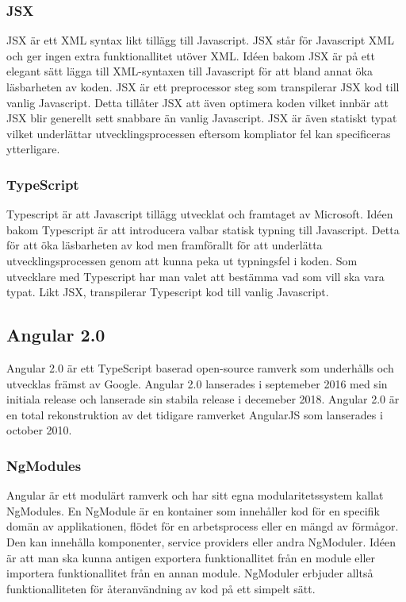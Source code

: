 \subsubsection{JSX}
JSX är ett XML syntax likt tillägg till Javascript. JSX står för Javascript XML och ger ingen extra funktionallitet utöver XML. Idéen bakom JSX är på ett elegant sätt lägga till XML-syntaxen till Javascript för att bland annat öka läsbarheten av koden. JSX är ett preprocessor steg som transpilerar JSX kod till vanlig Javascript. Detta tillåter JSX att även optimera koden vilket innbär att JSX blir generellt sett snabbare än vanlig Javascript. JSX är även statiskt typat vilket underlättar utvecklingsprocessen eftersom kompliator fel kan specificeras ytterligare. 


\subsubsection{TypeScript}
Typescript är att Javascript tillägg utvecklat och framtaget av Microsoft. Idéen bakom Typescript är att introducera valbar statisk typning till Javascript. Detta för att öka läsbarheten av kod men framförallt för att underlätta utvecklingsprocessen genom att kunna peka ut typningsfel i koden. Som utvecklare med Typescript har man valet att bestämma vad som vill ska vara typat. Likt JSX, transpilerar Typescript kod till vanlig Javascript. 


\subsection{Angular 2.0}
Angular 2.0 är ett TypeScript baserad open-source ramverk som underhålls och utvecklas främst av Google. Angular 2.0 lanserades i septemeber 2016 med sin initiala release och lanserade sin stabila release i decemeber 2018. Angular 2.0 är en total rekonstruktion av det tidigare ramverket AngularJS som lanserades i october 2010. 

\subsubsection{NgModules}
Angular är ett modulärt ramverk och har sitt egna modularitetssystem kallat NgModules. En NgModule är en kontainer som innehåller kod för en specifik domän av applikationen, flödet för en arbetsprocess eller en mängd av förmågor. Den kan innehålla komponenter, service providers eller andra NgModuler. Idéen är att man ska kunna antigen exportera funktionallitet från en module eller importera funktionallitet från en annan module. NgModuler erbjuder alltså funktionalliteten för återanvändning av kod på ett simpelt sätt. 

